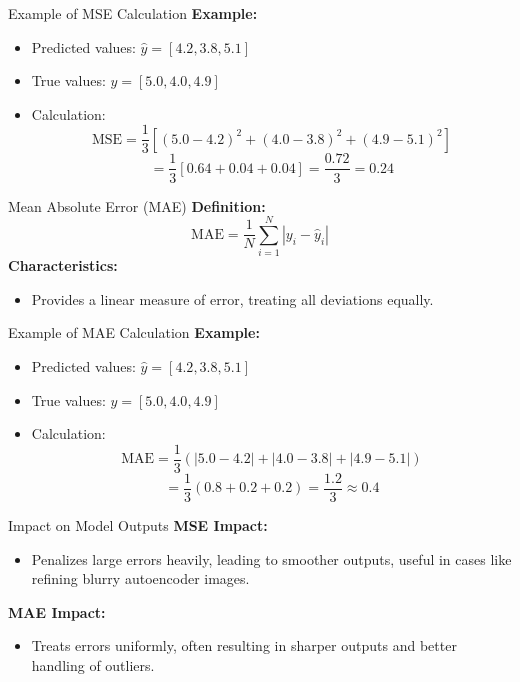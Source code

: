 \documentclass[serif, aspectratio=169]{beamer}
\begin{document}
\begin{frame}{Example of MSE Calculation}
    \textbf{Example:}
    \begin{itemize}
        \item Predicted values: \( \hat{y} = [4.2, 3.8, 5.1] \)
        \item True values: \( y = [5.0, 4.0, 4.9] \)
        \item Calculation:
        \[
        \text{MSE} = \frac{1}{3} \left[ (5.0 - 4.2)^2 + (4.0 - 3.8)^2 + (4.9 - 5.1)^2 \right]
        \]
        \[
        = \frac{1}{3} \left[ 0.64 + 0.04 + 0.04 \right] = \frac{0.72}{3} = 0.24
        \]
    \end{itemize}
\end{frame}

\begin{frame}{Mean Absolute Error (MAE)}
    \textbf{Definition:}
    \[
    \text{MAE} = \frac{1}{N} \sum_{i=1}^{N} \left| y_i - \hat{y}_i \right|
    \]
    \textbf{Characteristics:}
    \begin{itemize}
        \item Provides a linear measure of error, treating all deviations equally.
    \end{itemize}
\end{frame}

\begin{frame}{Example of MAE Calculation}
    \textbf{Example:}
    \begin{itemize}
        \item Predicted values: \( \hat{y} = [4.2, 3.8, 5.1] \)
        \item True values: \( y = [5.0, 4.0, 4.9] \)
        \item Calculation:
        \[
        \text{MAE} = \frac{1}{3} \left( |5.0 - 4.2| + |4.0 - 3.8| + |4.9 - 5.1| \right)
        \]
        \[
        = \frac{1}{3} (0.8 + 0.2 + 0.2) = \frac{1.2}{3} \approx 0.4
        \]
    \end{itemize}
\end{frame}

\begin{frame}{Impact on Model Outputs}
    \textbf{MSE Impact:}
    \begin{itemize}
        \item Penalizes large errors heavily, leading to smoother outputs, useful in cases like refining blurry autoencoder images.
    \end{itemize}
    
    \textbf{MAE Impact:}
    \begin{itemize}
        \item Treats errors uniformly, often resulting in sharper outputs and better handling of outliers.
    \end{itemize}
\end{frame}
\end{document}
